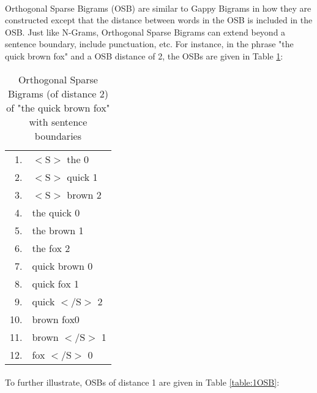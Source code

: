 		\paragraph{} Orthogonal Sparse Bigrams (OSB) are similar to Gappy Bigrams in how they are constructed except that the distance between words in the OSB is included in the OSB. Just like N-Grams, Orthogonal Sparse Bigrams can extend beyond a sentence boundary, include punctuation, etc. For instance, in the phrase "the quick brown fox" and a OSB distance of 2, the OSBs are given in Table \ref{table:2OSB}:
		\begin{center}
			\begin{table}[h]
				\begin{center}
					\begin{tabular}{ r l }
					1.  & $<\text{S}>$ the 0\\
					2.  & $<\text{S}>$ quick 1\\
					3.  & $<\text{S}>$ brown 2\\
					4.  & the quick 0\\
					5.  & the brown 1\\
					6.  & the fox 2\\
					7.  & quick brown 0\\
					8.  & quick fox 1\\
					9.  & quick $<\text{/S}>$ 2\\
					10. & brown fox0\\
					11. & brown $<\text{/S}>$ 1\\
					12. & fox $<\text{/S}>$ 0\\
					\end{tabular}
					\caption{Orthogonal Sparse Bigrams (of distance 2) of "the quick brown fox" with sentence boundaries}
					\label{table:2OSB}
				\end{center}
			\end{table}
		\end{center}
		
		\paragraph{}To further illustrate, OSBs of distance 1 are given in Table \ref{table:1OSB}:
		
